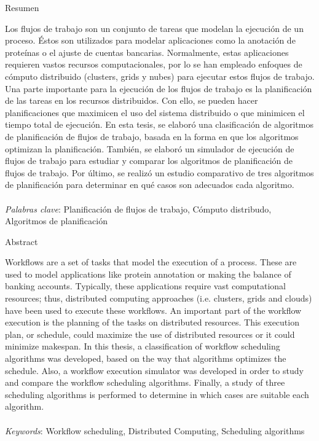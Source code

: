 \begin{center}
Resumen
\end{center}
\noindent Los flujos de trabajo son un conjunto de tareas que modelan la ejecución de un proceso. Éstos son utilizados para modelar aplicaciones como la anotación de proteínas o el ajuste de cuentas bancarias. Normalmente, estas aplicaciones requieren vastos recursos computacionales, por lo se han empleado enfoques de cómputo distribuido (clusters, grids y nubes) para ejecutar estos flujos de trabajo. Una parte importante para la ejecución de los flujos de trabajo es la planificación de las tareas en los recursos distribuidos. Con ello, se pueden hacer planificaciones que maximicen el uso del sistema distribuido o que minimicen el tiempo total de ejecución. En esta tesis, se elaboró una clasificación de algoritmos de planificación de flujos de trabajo, basada en la forma en que los algoritmos optimizan la planificación. También, se elaboró un simulador de ejecución de flujos de trabajo para estudiar y comparar los algoritmos de planificación de flujos de trabajo. Por último, se realizó un estudio comparativo de tres algoritmos de planificación para determinar en qué casos son adecuados cada algoritmo.
\\\\
\noindent \emph{Palabras clave}: Planificación de flujos de trabajo, Cómputo distribudo, Algoritmos de planificación

\begin{center}
Abstract
\end{center}
\noindent Workflows are a set of tasks that model the execution of a process. These are used to model applications like protein annotation or making the balance of banking accounts. Typically, these applications require vast computational resources; thus, distributed computing approaches (i.e. clusters, grids and clouds) have been used to execute these workflows. An important part of the workflow execution is the planning of the tasks on distributed resources. This execution plan, or schedule, could maximize the use of distributed resources or it could minimize makespan. In this thesis, a classification of workflow scheduling algorithms was developed, based on the way that algorithms optimizes the schedule. Also, a workflow execution simulator was developed in order to study and compare the workflow scheduling algorithms. Finally, a study of three scheduling algorithms is performed to determine in which cases are suitable each algorithm.
\\\\
\noindent \emph{Keywords}: Workflow scheduling, Distributed Computing, Scheduling algorithms

\clearpage
